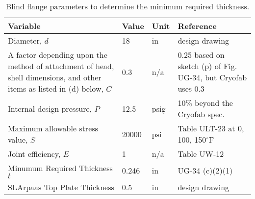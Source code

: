 \begin{table}[h]
\begin{center}
\tabcolsep=10pt
\begin{tabular}{>{\raggedleft}m{5cm}|l|l|m{6cm}}
\hline
\hline
Variable & Value & Unit & Reference \\
\hline
Diameter, $d$ & 18 & in & design drawing \\
A factor depending upon the method of attachment of head, shell dimensions, 
and other items as listed in (d) below, $C$ & 
0.3 & n/a & 0.25 based on sketch (p) of Fig. UG-34, but Cryofab uses 0.3 \\
Internal design pressure, $P$ & 12.5 & psig & 10\% beyond the Cryofab spec. \\
Maximum allowable stress value, $S$ & 20000 & psi & Table ULT-23 at 0, 100, 150$^{\circ}$F \\
Joint efficiency, $E$ & 1 & n/a & Table UW-12 \\
\hline
Minumum Required Thickness $t$ & 0.246 & in & UG-34 (c)(2)(1) \\
\hline
SLArpaas Top Plate Thickness & 0.5 & in & design drawing \\
\hline
\hline
\end{tabular}
\caption{Blind flange parameters to determine the minimum required thickness.}
\label{table:blind_flange}
\end{center}
\end{table}
